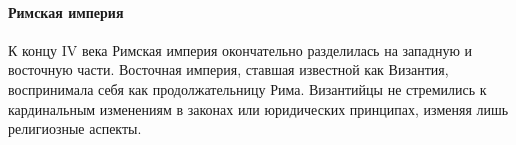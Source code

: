 \paragraph{Римская империя}

К концу IV века Римская империя окончательно разделилась на западную и восточную части. Восточная империя, ставшая известной как Византия, воспринимала себя как продолжательницу Рима. Византийцы не стремились к кардинальным изменениям в законах или юридических принципах, изменяя лишь религиозные аспекты.

